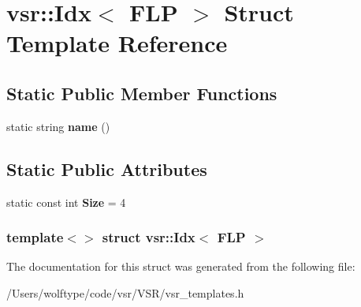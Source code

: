 \hypertarget{structvsr_1_1_idx_3_01_f_l_p_01_4}{\section{vsr\-:\-:Idx$<$ F\-L\-P $>$ Struct Template Reference}
\label{structvsr_1_1_idx_3_01_f_l_p_01_4}
}
\subsection*{Static Public Member Functions}
\begin{DoxyCompactItemize}
\item 
\hypertarget{structvsr_1_1_idx_3_01_f_l_p_01_4_a4a72b0b4a6f68d3fa24511a42e4c4de6}{static string {\bfseries name} ()}\label{structvsr_1_1_idx_3_01_f_l_p_01_4_a4a72b0b4a6f68d3fa24511a42e4c4de6}

\end{DoxyCompactItemize}
\subsection*{Static Public Attributes}
\begin{DoxyCompactItemize}
\item 
\hypertarget{structvsr_1_1_idx_3_01_f_l_p_01_4_ae84c2279de375f7c2819801a2244e9ab}{static const int {\bfseries Size} = 4}\label{structvsr_1_1_idx_3_01_f_l_p_01_4_ae84c2279de375f7c2819801a2244e9ab}

\end{DoxyCompactItemize}
\subsubsection*{template$<$$>$ struct vsr\-::\-Idx$<$ F\-L\-P $>$}



The documentation for this struct was generated from the following file\-:\begin{DoxyCompactItemize}
\item 
/\-Users/wolftype/code/vsr/\-V\-S\-R/vsr\-\_\-templates.\-h\end{DoxyCompactItemize}
